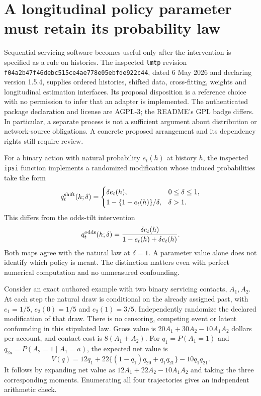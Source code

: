 \section{A longitudinal policy parameter must retain its probability law}
\label{exec23:lmtp-scope}

Sequential servicing software becomes useful only after the intervention is
specified as a rule on histories. The inspected \texttt{lmtp} revision
\texttt{f04a2b47f46debc515ce4ae778e05ebfde922c44}, dated 6 May 2026 and
declaring version 1.5.4, supplies ordered histories, shifted data, cross-fitting,
weights and longitudinal estimation interfaces. Its proposal disposition is a
reference choice with no permission to infer that an adapter is implemented.
The authenticated package declaration and license are AGPL-3; the README's
GPL badge differs. In particular, a separate process is not a sufficient
argument about distribution or network-source obligations. A concrete proposed
arrangement and its dependency rights still require review.
\citep{exec22_lmtp_reuse}

For a binary action with natural probability $e_t(h)$ at history $h$, the
inspected \texttt{ipsi} function implements a randomized modification whose
induced probabilities take the form
\begin{equation}
 q^{\rm shift}_t(h;\delta)=
 \begin{cases}
 \delta e_t(h),&0\leq\delta\leq1,\\
 1-\{1-e_t(h)\}/\delta,&\delta>1.
 \end{cases}
 \label{exec23:lmtp-shift}
\end{equation}
This differs from the odds-tilt intervention
\begin{equation}
 q^{\rm odds}_t(h;\delta)=
 \frac{\delta e_t(h)}{1-e_t(h)+\delta e_t(h)}.
 \label{exec23:lmtp-odds}
\end{equation}
Both maps agree with the natural law at $\delta=1$. A parameter value alone
does not identify which policy is meant. The distinction matters even with
perfect numerical computation and no unmeasured confounding.
\citep{exec22_lmtp_reuse,exec23_policy_reference}

Consider an exact authored example with two binary servicing contacts,
$A_1,A_2$. At each step the natural draw is conditional on the already assigned
past, with $e_1=1/5$, $e_2(0)=1/5$ and $e_2(1)=3/5$. Independently randomize
the declared modification of that draw. There is no censoring, competing event
or latent confounding in this stipulated law. Gross value is
$20A_1+30A_2-10A_1A_2$ dollars per account, and contact cost is
$8(A_1+A_2)$. For $q_1=P(A_1=1)$ and $q_{2a}=P(A_2=1\mid A_1=a)$,
the expected net value is
\begin{equation}
 V(q)=12q_1+22\{(1-q_1)q_{20}+q_1q_{21}\}-10q_1q_{21}.
 \label{exec23:lmtp-value}
\end{equation}
It follows by expanding net value as $12A_1+22A_2-10A_1A_2$ and taking
the three corresponding moments. Enumerating all four trajectories gives an
independent arithmetic check.~\citep{exec23_policy_reference}

